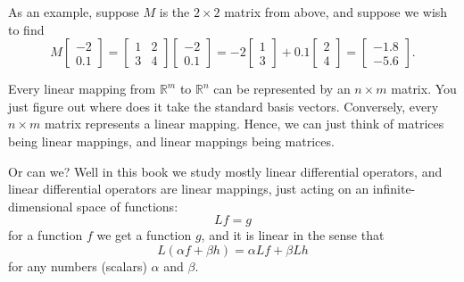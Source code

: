 As an example, suppose $M$ is the $2 \times 2$ matrix from above, and
suppose we wish to find
\begin{equation*}
M
\begin{bmatrix}
-2 \\ 0.1
\end{bmatrix}
=
\begin{bmatrix}
1 & 2 \\
3 & 4
\end{bmatrix}
\begin{bmatrix}
-2 \\ 0.1
\end{bmatrix}
=
-2
\begin{bmatrix}
1 \\ 3
\end{bmatrix}
+
0.1
\begin{bmatrix}
2 \\ 4
\end{bmatrix}
=
\begin{bmatrix}
-1.8 \\ -5.6
\end{bmatrix} .
\end{equation*}

Every linear mapping from ${\mathbb R}^m$ to ${\mathbb R}^n$ can be
represented by an $n \times m$ matrix.  You just figure out where does it
take the standard basis vectors.  Conversely, every $n \times m$ matrix
represents a linear mapping.  Hence, we can just think of matrices being
linear mappings, and linear mappings being matrices.

Or can we?  Well in this book we study mostly linear differential operators,
and linear differential operators are linear mappings, just acting on
an infinite-dimensional space of functions:
\begin{equation*}
L f = g
\end{equation*}
for a function $f$ we get a function $g$, and it is linear in the sense that
\begin{equation*}
L (\alpha f + \beta h) = \alpha Lf + \beta Lh
\end{equation*}
for any numbers (scalars) $\alpha$ and $\beta$.

